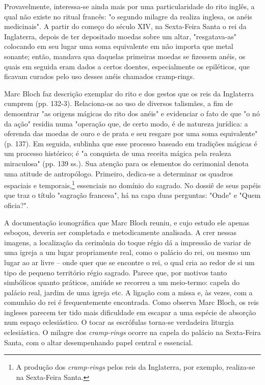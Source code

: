 \documentclass[a5paper]{book}
\begin{document}
Provavelmente, interessa-se ainda mais por uma particularidade do rito inglês, a qual não existe no ritual francês: "o segundo milagre da realiza inglesa, os anéis medicinais". A partir do começo do século XIV, na Sexta-Feira Santa o rei da Inglaterra, depois de ter depositado moedas sobre um altar, "resgatava-as" colocando em seu lugar uma soma equivalente em não importa que metal sonante; então, mandava qua daquelas primeiras moedas se f{\kern0pt}izessem anéis, os quais em seguida eram dados a certos doentes, especialmente os epiléticos, que f{\kern0pt}icavam curados pelo uso desses anéis chamados cramp-rings.

Marc Bloch faz descrição exemplar do rito e dos gestos que os reis da Inglaterra cumprem (pp. 132-3). Relaciona-os ao uso de diversos talismães, a f{\kern0pt}im de demosntrar "as origens mágicas do rito dos anéis" e evidenciar o fato de que "o nó da ação" residia numa "operação que, de certo modo, é de natureza jurídica: a oferenda das moedas de ouro e de prata e seu resgare por uma soma equivalente" (p. 137). Em seguida, sublinha que esse processo baseado em tradições mágicas é um processo histórico; é "a conquista de uma receita mágica pela realeza miraculosa" (pp. 139 ss.). Sua atenção para os elementos do cerimonial denota uma atitude de antropólogo. Primeiro, dedica-se a determinar os quadros espaciais e temporais,\footnote{A produção dos \textit{cramp-rings} pelos reis da Inglaterra, por exemplo, realiza-se na Sexta-Feira Santa.} essenciais no domínio do sagrado. No dossiê de seus papéis que traz o título "sagração francesa", há na capa duas perguntas: "Onde" e "Quem of{\kern0pt}icia?".

A documentação iconográf{\kern0pt}ica que Marc Bloch reuniu, e cujo estudo ele apenas esboçou, deveria ser completada e metodicamente analisada. A crer nessas imagens, a localização da cerimônia do toque régio dá a impressão de variar de uma igreja a um lugar propriamente real, como o palácio do rei, ou mesmo um lugar ao ar livre -- onde quer que se encontre o rei, o qual cria ao redor de si um tipo de pequeno território régio sagrado. Parece que, por motivos tanto simbólicos quanto práticos, amiúde se recorreu a um meio-termo: capela do palácio real, jardim de uma igreja etc. A ligação com a missa e, às vezes, com a comunhão do rei é frequentemente encontrada. Como observa Marc Bloch, os reis ingleses parecem ter tido mais dif{\kern0pt}iculdade em escapar a uma espécie de absorção num espaço eclesiástico. O tocar as escrófulas torna-se verdadeira liturgia eclesiástica. O milagre dos \textit{cramp-rings} ocorre na capela do palácio na Sexta-Feira Santa, com o altar desempenhando papel central e essencial.
\end{document}
